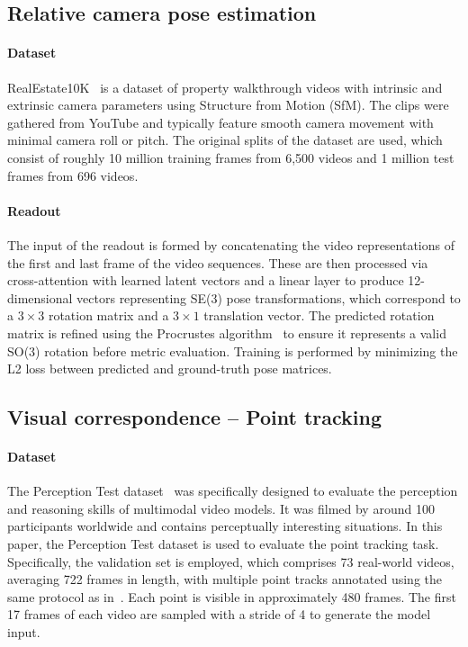 \subsection{Relative camera pose estimation}
\paragraph{Dataset}
RealEstate10K~\cite{zhou2018stereo} is a dataset of property walkthrough videos with intrinsic and extrinsic camera parameters using Structure from Motion (SfM). The clips were gathered from YouTube and typically feature smooth camera movement with minimal camera roll or pitch. The original splits of the dataset are used, which consist of roughly 10 million training frames from 6,500 videos and 1 million test frames from 696 videos.


\paragraph{Readout}
The input of the readout is formed by concatenating the video representations of the first and last frame of the video sequences.  These are then processed via cross-attention with learned latent vectors and a linear layer to produce 12-dimensional vectors representing SE(3) pose transformations, which correspond to a $3\times3$ rotation matrix and a $3\times1$ translation vector. The predicted rotation matrix is refined using the Procrustes algorithm~\cite{bregier2021deep} to ensure it represents a valid SO(3) rotation before metric evaluation. Training is performed by minimizing the L2 loss between predicted and ground-truth pose matrices.

\subsection{Visual correspondence -- Point tracking}
\paragraph{Dataset}
The Perception Test dataset~\cite{perception-test} was specifically designed to evaluate the perception and reasoning skills of multimodal video models. It was filmed by around 100 participants worldwide and contains perceptually interesting situations. In this paper, the Perception Test dataset is used to evaluate the point tracking task. Specifically, the validation set is employed, which comprises 73 real-world videos, averaging 722 frames in length, with multiple point tracks annotated using the same protocol as in~\cite{moog}. Each point is visible in approximately 480 frames. The first 17 frames of each video are sampled with a stride of 4 to generate the model input.

